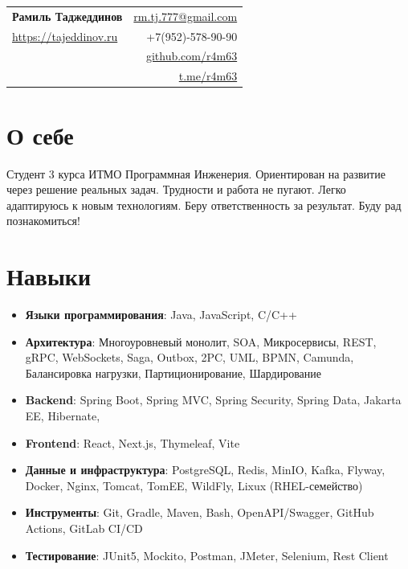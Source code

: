 \documentclass[11pt,a4paper]{article}
\makeatletter
\newcommand{\resumeHeader}[6]{
  \begin{tabular*}{\textwidth}{@{\extracolsep{\fill}} l r}
    {\LARGE \textbf{#1}} & #3 \\
    #2 & #4 \\
     & #5 \\
     & #6 \\
  \end{tabular*}
}
\newcommand{\resumeProjectItem}[2]{
  \item \textbf{#1}: #2
}
\newenvironment{resumeTopList}{
  \begin{itemize}[leftmargin=1.1em,itemsep=0.3em,topsep=0.2em]
}{
  \end{itemize}
}
\makeatother
\begin{document}
\resumeHeader
  {Рамиль Таджеддинов}
  {\href{https://tajeddinov.ru}{https://tajeddinov.ru}}
  {\href{mailto:rm.tj.777@gmail.com}{rm.tj.777@gmail.com}}
  {+7(952)-578-90-90}
  {\href{https://github.com/r4m63}{github.com/r4m63}}
  {\href{https://t.me/r4m63}{t.me/r4m63}}

\section*{О себе}

Студент 3 курса ИТМО Программная Инженерия.
Ориентирован на развитие через решение реальных задач.
Трудности и работа не пугают.
Легко адаптируюсь к новым технологиям.
Беру ответственность за результат.
Буду рад познакомиться!

\section*{Навыки}
\begin{resumeTopList}
  \resumeProjectItem
    {Языки программирования}
    {Java, JavaScript, C/C++}
  \resumeProjectItem
    {Архитектура}
    {Многоуровневый монолит, SOA, Микросервисы, REST, gRPC, WebSockets, Saga, Outbox, 2PC, UML, BPMN, Camunda, Балансировка нагрузки, Партиционирование, Шардирование}
  \resumeProjectItem
    {Backend}
    {Spring Boot, Spring MVC, Spring Security, Spring Data, Jakarta EE, Hibernate,}
  \resumeProjectItem
    {Frontend}
    {React, Next.js, Thymeleaf, Vite}
  \resumeProjectItem
    {Данные и инфраструктура}
    {PostgreSQL, Redis, MinIO, Kafka, Flyway, Docker, Nginx, Tomcat, TomEE, WildFly, Lixux (RHEL-семейство)}
  \resumeProjectItem
    {Инструменты}
    {Git, Gradle, Maven, Bash, OpenAPI/Swagger, GitHub Actions, GitLab CI/CD}
  \resumeProjectItem
    {Тестирование}
    {JUnit5, Mockito, Postman, JMeter, Selenium, Rest Client}
\end{resumeTopList}
\end{document}
